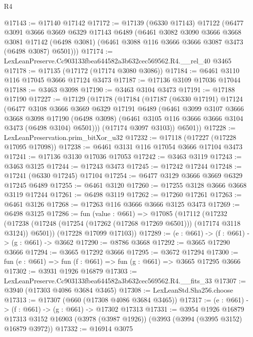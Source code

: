 \begin{lexlean}{R4}
\begin{coremodule}
@17143 := @17140 @17142
@17172 := @17139
    (@6330 @17143)
    @17122
    (@6477
      @3091
      @3666
      @3669
      @6329
      @17143
      @6489
      (@6461
        @3082
        @3090
        @3666
        @3668
        @3081
        @17142
        (@6498 @3081)
        (@6461 @3088 @116 @3666 @3666 @3087 @3473 (@6498 @3087) @6501)))
@17174 := LexLeanPreserve.Cc903133fbea644582a3b632cec569562.R4.__rel_40 @3465
@17178 := @17135 (@17172 (@17174 @3080 @3086))
@17184 := @6461 @3110 @116 @17045 @3666 @17124 @3473
@17187 := @17136 @3109 @17036 @17044
@17188 := @3463 @3098
@17190 := @3463 @3104 @3473
@17191 := @17188 @17190
@17227 := @17129
    (@17178
      (@17184
        (@17187
          (@6330 @17191)
          @17124
          (@6477
            @3108
            @3666
            @3669
            @6329
            @17191
            @6489
            (@6461
              @3099
              @3107
              @3666
              @3668
              @3098
              @17190
              (@6498 @3098)
              (@6461 @3105 @116 @3666 @3666 @3104 @3473 (@6498 @3104) @6501)))
          (@17174 @3097 @3103))
        @6501))
@17228 := LexLeanPreservation.prim_bitXor_u32
@17232 := @17118 (@17227 (@17228 @17095 @17098))
@17238 := @6461 @3131 @116 @17054 @3666 @17104 @3473
@17241 := @17136 @3130 @17036 @17053
@17242 := @3463 @3119
@17243 := @3463 @3125
@17244 := @17243 @3473
@17245 := @17242 @17244
@17248 := @17241 (@6330 @17245) @17104
@17254 := @6477 @3129 @3666 @3669 @6329 @17245 @6489
@17255 := @6461 @3120
@17260 := @17255 @3128 @3666 @3668 @3119 @17244
@17261 := @6498 @3119
@17262 := @17260 @17261
@17263 := @6461 @3126
@17268 := @17263 @116 @3666 @3666 @3125 @3473
@17269 := @6498 @3125
@17286 := fun (value : @661) =>
  @17085
    (@17112
      (@17232 (@17238 (@17248 (@17254 (@17262 (@17268 @17269 @6501))) (@17174 @3118 @3124)) @6501))
      (@17228 @17099 @17103))
@17289 := (e : @661) -> (f : @661) -> (g : @661) -> @3662
@17290 := @8786 @3668
@17292 := @3665 @17290 @3666
@17294 := @3665 @17292 @3666
@17295 := @3672 @17294
@17300 := fun (e : @661) => fun (f : @661) => fun (g : @661) => @3665 @17295 @3666
@17302 := @3931 @1926 @16879
@17303 := LexLeanPreserve.Cc903133fbea644582a3b632cec569562.R4.__fits_33
@17307 := @3940 (@17303 @4086 @3684 @3465)
@17308 := LexLeanStd.Sha256.choose
@17313 := @17307 (@660 (@17308 @4086 @3684 @3465))
@17317 := (e : @661) -> (f : @661) -> (g : @661) -> @17302 @17313
@17331 := @3954
    @1926
    @16879
    @17313
    @3152
    @16903
    (@3978 (@3987 @1926))
    (@3993 (@3994 (@3995 @3152) @16879 @3972))
@17332 := @16914 @3075

\end{coremodule}
\end{lexlean}
